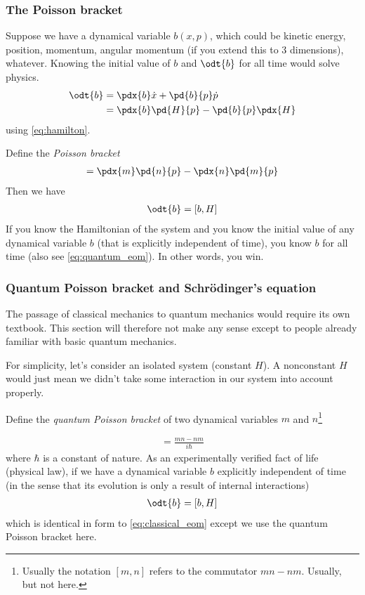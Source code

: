\documentclass[12pt, oneside, letterpaper, fleqn]{article}
\begin{document}
\subsubsection{The Poisson bracket}
Suppose we have a dynamical variable $b(x,p)$, which could be kinetic
energy, position, momentum, angular momentum (if you extend this to 3
dimensions), whatever. Knowing the initial value of $b$ and $\odt{b}$
for all time would solve physics.
\begin{align*}
\odt{b} &= \pdx{b}\dot{x} + \pd{b}{p}\dot{p}\\
&= \pdx{b}\pd{H}{p} - \pd{b}{p}\pdx{H}
\end{align*}
using \eqref{eq:hamilton}.

Define the \emph{Poisson bracket}
\begin{align}
[m, n] = \pdx{m}\pd{n}{p} - \pdx{n}\pd{m}{p}
\end{align}
Then we have
\begin{align}\label{eq:classical_eom}
\odt{b} = [b, H]
\end{align}
If you know the Hamiltonian of the system and you know the initial value
of any dynamical variable $b$ (that is explicitly independent of time),
you know $b$ for all time (also see \eqref{eq:quantum_eom}). In other
words, you win.

\subsubsection{Quantum Poisson bracket and Schr\"odinger's
equation}\label{sec:quantum}
The passage of classical mechanics to quantum mechanics would require
its own textbook. This section will therefore not make any sense except
to people already familiar with basic quantum mechanics.

For simplicity, let's consider an isolated system (constant $H$). A
nonconstant $H$ would just mean we didn't take some interaction in our
system into account properly.

Define the \emph{quantum Poisson bracket} of two dynamical variables $m$
and $n$\footnote{Usually the notation $[m,n]$ refers to the commutator
$mn-nm$. Usually, but not here.}

\begin{align}
[m, n] = \frac{mn - nm}{i\hbar}
\end{align}
where $\hbar$ is a constant of nature. As an experimentally verified
fact of life (physical law), if we have a dynamical variable $b$
explicitly independent of time (in the sense that its evolution is only
a result of internal interactions)
\begin{align}\label{eq:quantum_eom}
\odt{b} = [b, H]
\end{align}
which is identical in form to \eqref{eq:classical_eom} except we use
the quantum Poisson bracket here.
\end{document}
